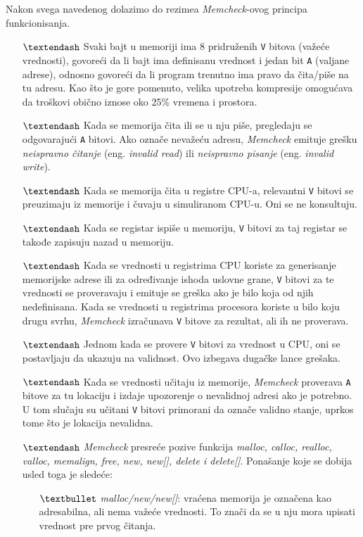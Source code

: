 \documentclass[12pt,oneside]{memoir}
\theoremstyle{plain}
\theoremstyle{definition}
\begin{document}
Nakon svega navedenog dolazimo do rezimea \textit{Memcheck}-ovog principa funkcionisanja.
\begin{itemize}
\item[$\textendash$] Svaki bajt u memoriji ima 8 pridruženih \texttt{V} bitova (važeće vrednosti), govoreći da li bajt ima definisanu vrednost i jedan bit \texttt{A} (valjane adrese), odnosno govoreći da li program trenutno ima pravo da čita/piše na tu adresu. Kao što je gore pomenuto, velika upotreba kompresije omogućava da troškovi obično iznose oko 25\% vremena i prostora.
\item[$\textendash$] Kada se memorija čita ili se u nju piše, pregledaju se odgovarajući \texttt{A} bitovi. Ako označe nevažeću adresu, \textit{Memcheck} emituje grešku \textit{neispravno čitanje} (eng. \textit{invalid read}) ili \textit{neispravno pisanje} (eng. \textit{invalid write}).
\item[$\textendash$] Kada se memorija čita u registre CPU-a, relevantni \texttt{V} bitovi se preuzimaju iz memorije i čuvaju u simuliranom CPU-u. Oni se ne konsultuju.
\item[$\textendash$] Kada se registar ispiše u memoriju, \texttt{V} bitovi za taj registar se takođe zapisuju nazad u memoriju.
\item[$\textendash$] Kada se vrednosti u registrima CPU koriste za generisanje memorijske adrese ili za određivanje ishoda uslovne grane, \texttt{V} bitovi za te vrednosti se proveravaju i emituje se greška ako je bilo koja od njih nedefinisana. Kada se vrednosti u registrima procesora koriste u bilo koju drugu svrhu, \textit{Memcheck} izračunava \texttt{V} bitove za rezultat, ali ih ne proverava.
\item[$\textendash$] Jednom kada se provere \texttt{V} bitovi za vrednost u CPU, oni se postavljaju da ukazuju na validnost. Ovo izbegava dugačke lance grešaka.
\item[$\textendash$] Kada se vrednosti učitaju iz memorije, \textit{Memcheck} proverava \texttt{A} bitove za tu lokaciju i izdaje upozorenje o nevalidnoj adresi ako je potrebno. U tom slučaju su učitani \texttt{V} bitovi primorani da označe validno stanje, uprkos tome što je lokacija nevalidna. 
\item[$\textendash$] \textit{Memcheck} presreće pozive funkcija \textit{malloc, calloc, realloc, valloc, memalign, free, new, new[], delete i delete[]}. Ponašanje koje  se dobija usled toga je sledeće:
	\begin{itemize}
	\item[$\textbullet$] \textit{malloc/new/new[]}: vraćena memorija je označena kao adresabilna, ali nema važeće vrednosti. To znači da se u nju mora upisati vrednost pre prvog čitanja.

\end{itemize}
\end{itemize}
\end{document}
